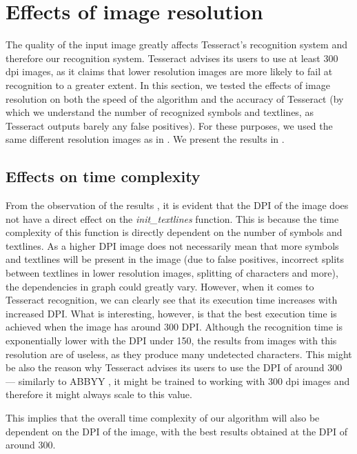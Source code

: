 \section{Effects of image resolution}

The quality of the input image greatly affects Tesseract's recognition system and therefore our recognition system. Tesseract advises its users to use at least 300 dpi images, as it claims that lower resolution images are more likely to fail at recognition to a greater extent. In this section, we tested the effects of image resolution on both the speed of the algorithm and the accuracy of Tesseract (by which we understand the number of recognized symbols and textlines, as Tesseract outputs barely any false positives). For these purposes, we used the same different resolution images as in . We present the results in . 

\subsection{Effects on time complexity}

From the observation of the results , it is evident that the DPI of the image does not have a direct effect on the \emph{init\_textlines} function. This is because the time complexity of this function is directly dependent on the number of symbols and textlines. As a higher DPI image does not necessarily mean that more symbols and textlines will be present in the image (due to false positives, incorrect splits between textlines in lower resolution images, splitting of characters and more), the dependencies in graph  could greatly vary. However, when it comes to Tesseract recognition, we can clearly see  that its execution time increases with increased DPI. What is interesting, however, is that the best execution time is achieved when the image has around 300 DPI. Although the recognition time is exponentially lower with the DPI under 150, the results from images with this resolution are of useless, as they produce many undetected characters. This might be also the reason why Tesseract advises its users to use the DPI of around 300 --- similarly to ABBYY , it might be trained to working with 300 dpi images and therefore it might always scale to this value.

This implies that the overall time complexity of our algorithm will also be dependent on the DPI of the image, with the best results obtained at the DPI of around 300.

